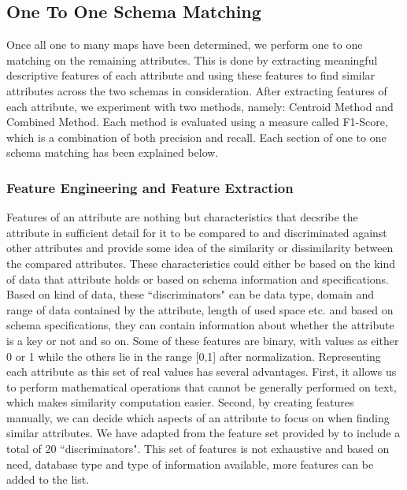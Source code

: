 \documentclass[conference]{IEEEtran}
\begin{document}
\subsection{One To One Schema Matching}
Once all one to many maps have been determined, we perform one to one matching on the remaining attributes. This is done by extracting meaningful descriptive features of each attribute and using these features to find similar attributes across the two schemas in consideration. After extracting features of each attribute, we experiment with two methods, namely: Centroid Method and Combined Method. Each method is evaluated using a measure called F1-Score, which is a combination of both precision and recall. Each section of one to one schema matching has been explained below.

\subsubsection*{\textbf{Feature Engineering and Feature Extraction}}

Features of an attribute are nothing but characteristics that decsribe the attribute in sufficient detail for it to be compared to and discriminated against other attributes and provide some idea of the similarity or dissimilarity between the compared attributes. These characteristics could either be based on the kind of data that attribute holds or based on schema information and specifications. Based on kind of data, these ``discriminators" can be data type, domain and range of data contained by the attribute, length of used space etc. and based on schema specifications, they can contain information about whether the attribute is a key or not and so on. Some of these features are binary, with values as either 0 or 1 while the others lie in the range [0,1] after normalization. Representing each attribute as this set of real values has several advantages. First, it allows us to perform mathematical operations that cannot be generally performed on text, which makes similarity computation easier. Second, by creating features manually, we can decide which aspects of an attribute to focus on when finding similar attributes. We have adapted from the feature set provided by \cite{ref1} to include a total of 20 ``discriminators". This set of features is not exhaustive and based on need, database type and type of information available, more features can be added to the list.
\end{document}
